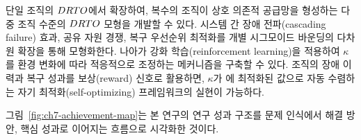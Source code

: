 단일 조직의 $DRTO$에서 확장하여, 복수의 조직이 상호 의존적 공급망을
형성하는 다중 조직 수준의 $DRTO$ 모형을 개발할 수 있다.
시스템 간 장애 전파(cascading failure) 효과, 공유 자원 경쟁,
복구 우선순위 최적화를 개별 시그모이드 바운딩의 다차원 확장을 통해 모형화한다.
나아가 강화 학습(reinforcement learning)을 적용하여
$\kappa$를 환경 변화에 따라 적응적으로 조정하는 메커니즘을 구축할 수 있다.
조직의 장애 이력과 복구 성과를 보상(reward) 신호로 활용하면,
$\kappa$가 에 최적화된 값으로
자동 수렴하는 자기 최적화(self-optimizing) 프레임워크의 실현이 가능하다.

\vspace{0.5em}

\p{[}그림~\vref{fig:ch7-achievement-map}\p{]}는 본 연구의 연구 성과 구조를
문제 인식에서 해결 방안, 핵심 성과로 이어지는 흐름으로 시각화한 것이다.

